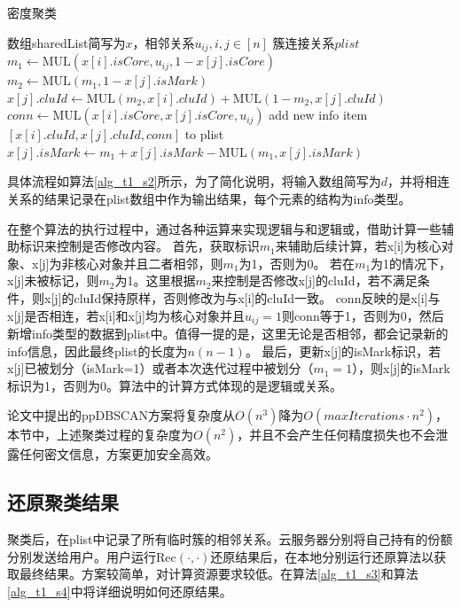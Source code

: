 \begin{algorithm}[htbp]
	\renewcommand{\algorithmicrequire}{\textbf{输入:}}
	\renewcommand{\algorithmicensure}{\textbf{输出:}}
	\caption{密度聚类}
	\label{alg_t1_s2}
	\begin{algorithmic}[1]
		\REQUIRE 数组sharedList简写为$ x $，相邻关系$ u_{ij},i,j\in[n] $
		\ENSURE 簇连接关系$ plist $
		\STATE $ m_1 \leftarrow \text{MUL}(x[i].isCore, u_{ij}, 1-x[j].isCore) $
		\STATE $ m_2 \leftarrow \text{MUL}(m_1, 1-x[j].isMark) $
		\STATE $ x[j].cluId \leftarrow  \text{MUL}(m_2, x[i].cluId) + \text{MUL}(1-m_2, x[j].cluId)$
		\STATE $ conn \leftarrow \text{MUL}(x[i].isCore, x[j].isCore, u_{ij}) $
		\STATE add new info item $ [x[i].cluId, x[j].cluId, conn] $ to plist
		\STATE $ x[j].isMark \leftarrow m_1 + x[j].isMark - \text{MUL}(m_1, x[j].isMark) $
		\ENDFOR
		\ENDFOR
	\end{algorithmic}
\end{algorithm}

具体流程如算法\ref{alg_t1_s2}所示，为了简化说明，将输入数组简写为$ d $，并将相连关系的结果记录在plist数组中作为输出结果，每个元素的结构为info类型。

在整个算法的执行过程中，通过各种运算来实现逻辑与和逻辑或，借助计算一些辅助标识来控制是否修改内容。
首先，获取标识$ m_1 $来辅助后续计算，若x[i]为核心对象、x[j]为非核心对象并且二者相邻，则$ m_1 $为1，否则为0。
若在$ m_1 $为1的情况下，x[j]未被标记，则$ m_2 $为1。这里根据$ m_2 $来控制是否修改x[j]的cluId，若不满足条件，则x[j]的cluId保持原样，否则修改为与x[i]的cluId一致。
conn反映的是x[i]与x[j]是否相连，若x[i]和x[j]均为核心对象并且$ u_{ij}=1 $则conn等于1，否则为0，然后新增info类型的数据到plist中。值得一提的是，这里无论是否相邻，都会记录新的info信息，因此最终plist的长度为$ n(n-1) $。
最后，更新x[j]的isMark标识，若x[j]已被划分（isMark=1）或者本次迭代过程中被划分（$ m_1 = 1 $），则x[j]的isMark标识为1，否则为0。算法中的计算方式体现的是逻辑或关系。

论文\cite{bozdemir2021privacy}中提出的ppDBSCAN方案将复杂度从$ O(n^3)$降为$ O(maxIterations \cdot n^2) $，本节中，上述聚类过程的复杂度为$ O(n^2) $，并且不会产生任何精度损失也不会泄露任何密文信息，方案更加安全高效。

\subsection{还原聚类结果}
\label{task1-huanyuan}
聚类后，在plist中记录了所有临时簇的相邻关系。云服务器分别将自己持有的份额分别发送给用户。用户运行$ \text{Rec}(\cdot,\cdot) $还原结果后，在本地分别运行还原算法以获取最终结果。方案较简单，对计算资源要求较低。在算法\ref{alg_t1_s3}和算法\ref{alg_t1_s4}中将详细说明如何还原结果。

